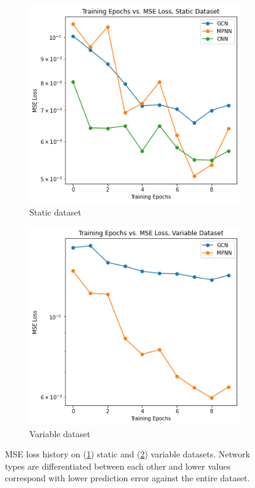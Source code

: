 \documentclass{siamart190516}
\begin{document}
\begin{figure}[h]
  \centering
  \begin{subfigure}{.48\textwidth}
    \includegraphics[width=\textwidth]{figs/static_mse.png}
    \caption{Static dataset}
    \label{subfig:conv_static_mse}
  \end{subfigure}
  \begin{subfigure}{.48\textwidth}
    \includegraphics[width=\textwidth]{figs/variable_mse.png}
    \caption{Variable dataset}
    \label{subfig:conv_variable_mse}
  \end{subfigure}
  \caption{MSE loss history on (\ref{subfig:conv_static_mse}) static and (\ref{subfig:conv_variable_mse}) variable datasets.  Network types are differentiated between each other and lower values correspond with lower prediction error against the entire dataset.}
  \label{fig:conv_train_history}
\end{figure}
\end{document}
